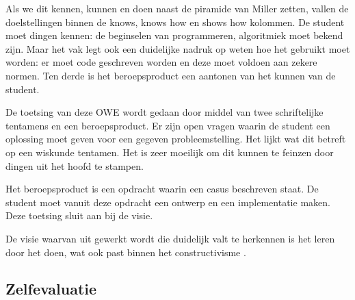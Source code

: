Als we dit kennen, kunnen en doen naast de piramide van Miller zetten, vallen de doelstellingen binnen de knows, knows how en shows how kolommen. De student moet dingen kennen: de beginselen van programmeren, algoritmiek moet bekend zijn. Maar het vak legt ook een duidelijke nadruk op weten hoe het gebruikt moet worden: er moet code geschreven worden en deze moet voldoen aan zekere normen. Ten derde is het beroepsproduct een aantonen van het kunnen van de student.

De toetsing van deze OWE wordt gedaan door middel van twee schriftelijke tentamens en een beroepsproduct. Er zijn open vragen waarin de student een oplossing moet geven voor een gegeven probleemstelling. Het lijkt wat dit betreft op een wiskunde tentamen. Het is zeer moeilijk om dit kunnen te feinzen door dingen uit het hoofd te stampen.

Het beroepsproduct is een opdracht waarin een casus beschreven staat. De student moet vanuit deze opdracht een ontwerp en een implementatie maken. Deze toetsing sluit aan bij de visie.

De visie waarvan uit gewerkt wordt die duidelijk valt te herkennen is het leren door het doen, wat ook past binnen het constructivisme \cite{keursten2006ontwikkeling}.



\subsection{Zelfevaluatie}

